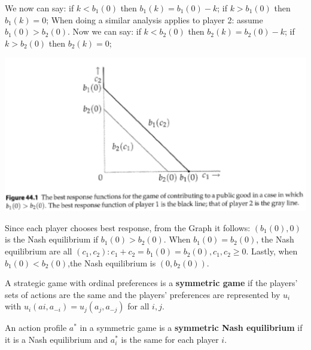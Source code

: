 \begin{illustration}
      We now can say:
      if $k<b_1 (0)$ then $b_1(k)=b_1(0)- k$;
      if $k>b_1 (0)$ then $b_1( k)=0$;
      When doing a similar analysis applies to player 2: assume $b_1 (0) > b_2(0)$. Now we can say:
      if $k<b_2 (0)$ then $b_2(k)=b_2(0)- k$;
      if $k>b_2 (0)$ then $b_2(k)=0$;

      \includegraphics[width=1\textwidth]{im2.png}

      Since each player chooses best response, from the Graph it follows: $(b_1(0),0)$ is the Nash equilibrium if $b_1(0) > b_2(0)$. When $b_1(0) = b_2(0)$, the Nash equilibrium are all $(c_1,c_2) : c_1+c_2 = b_1(0) = b_2(0), c_1, c_2 \ge 0$. Lastly, when $b_1(0) < b_2(0)$,the Nash equilibrium is $(0,b_2(0))$.
\end{illustration}


\begin{definition}
      A strategic game with ordinal preferences is a \textbf{symmetric game} if the players' sets
      of actions are the same and the players' preferences are represented by $u_i$ with
      $u_i(a i , a_{-i} ) = u_j (a_j , a_{-j} )$ for all $i,j$.
\end{definition}


\begin{definition}
      An action profile $a^*$ in a symmetric game is a \textbf{symmetric Nash equilibrium} if it is a Nash equilibrium and $a^*_i$ is the same for each player $i$.
\end{definition}